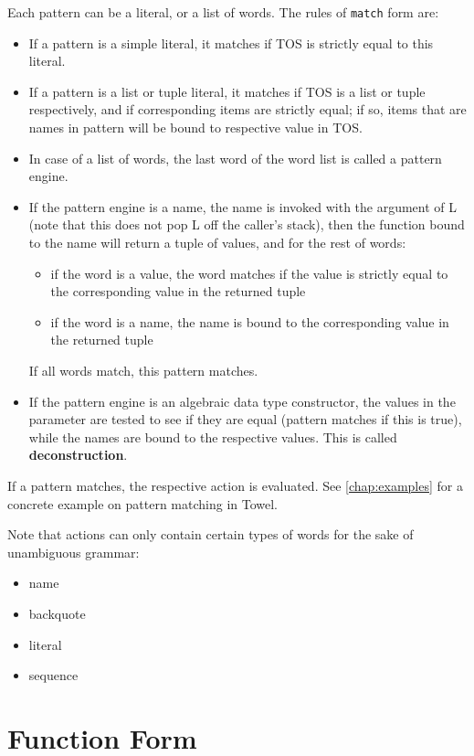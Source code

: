 \documentclass{book}
\begin{document}
Each pattern can be a literal, or a list of words. The rules of \texttt{match} form are:
\begin{itemize}
\item If a pattern is a simple literal, it matches if TOS is strictly equal to
  this literal.
\item If a pattern is a list or tuple literal, it matches if TOS is a list or tuple respectively, and if corresponding items are strictly equal; if so, items that are names in pattern will be bound to respective value in TOS.
\item In case of a list of words, the last word of the word list
  is called a pattern engine.
\item If the pattern engine is a name, the name is invoked with the argument of L (note that
  this does not pop L off the caller's stack), then the function bound
  to the name will return a tuple of values, and for the rest of
  words:
  \begin{itemize}
  \item if the word is a value, the word matches if the value is strictly
    equal to the corresponding value in the returned tuple
  \item if the word is a name, the name is bound to the corresponding
    value in the returned tuple
  \end{itemize}
  If all words match, this pattern matches.
\item If the pattern engine is an algebraic data type constructor, the values in the parameter are tested to see if they are equal (pattern matches if this is true), while the names are bound to the respective values. This is called \textbf{deconstruction}.
\end{itemize}

If a pattern matches, the respective action is evaluated. See \autoref{chap:examples} for a concrete example on pattern matching in Towel.

Note that actions can only contain certain types of words for the sake of unambiguous grammar:
\begin{itemize}
\item name
\item backquote
\item literal
\item sequence
\end{itemize}

\section{Function Form}
\end{document}
